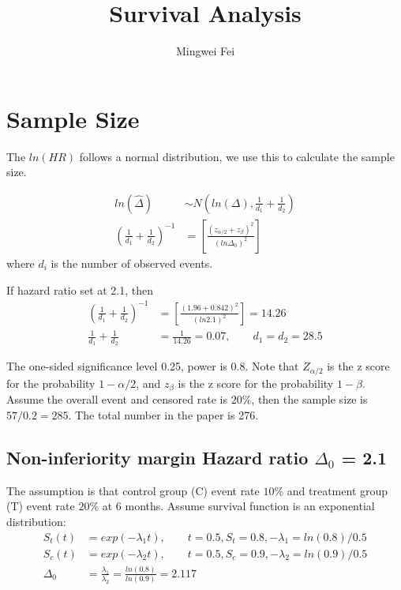\documentclass[11pt]{article} %
\title{Survival Analysis}
\author{Mingwei Fei}
\begin{document}
	
	\maketitle
	
	\section{Sample Size}
	The $ln(HR)$ follows a normal distribution, we use this to calculate the sample size.
	
	\begin{align*}
	ln (\hat{\Delta}) & \sim N\left(ln(\Delta),  \frac{1}{d_1} + \frac{1}{d_2} \right) \\
	\left( \frac{1}{d_1} + \frac{1}{d_2} \right)^{-1} &= \left[ \frac{(z_{\alpha/2} + z_{\beta})^2}{(ln \Delta_0)^2} \right] 
	\end{align*}
	where $d_i$ is the number of observed events. 
	
	If hazard ratio set at 2.1, then 
	\begin{align*}
	\left( \frac{1}{d_1} + \frac{1}{d_2} \right)^{-1} &= \left[ \frac{(1.96 + 0.842)^2}{(ln 2.1)^2} \right] = 14.26\\
	\frac{1}{d_1} + \frac{1}{d_2} &= \frac{1}{14.26} = 0.07, \qquad	d_1 = d_2 = 28.5
	\end{align*}
	
	The one-sided significance level 0.25, power is 0.8. Note that $Z_{\alpha/2}$ is the z score for the probability $1-\alpha/2$, and $z_{\beta}$ is the z score for the probability $1-\beta$. Assume the overall event and censored rate is $20\%$, then the sample size is $57/0.2 = 285$. The total number in the paper is 276.
	
	
	\subsection{Non-inferiority margin Hazard ratio $\Delta_0$ = 2.1}
	The assumption is that control group (C) event rate $10\%$ and treatment group (T) event rate $20\%$ at 6 months. Assume survival function is an exponential distribution:
	\begin{align*}
	S_t(t) &= exp(-\lambda_1 t), \qquad t= 0.5, S_t = 0.8 , -\lambda_1 = ln(0.8)/0.5\\
	S_c(t) &=  exp(-\lambda_2 t), \qquad t= 0.5, S_c = 0.9, -\lambda_2 = ln(0.9)/0.5  \\
	\Delta_0 &= \frac{\lambda_1}{\lambda_2}= \frac{ln(0.8)}{ln(0.9)} = 2.117
	\end{align*}	
\end{document}
